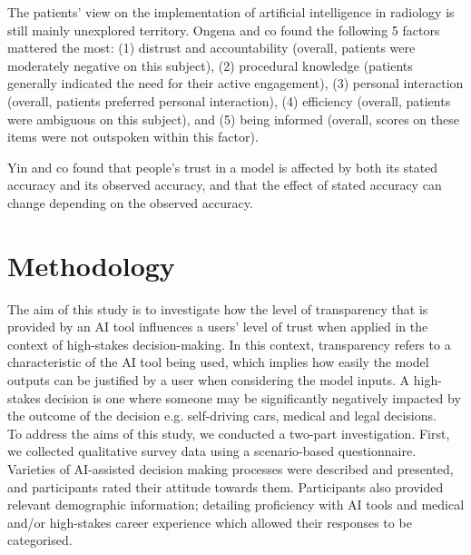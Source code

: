 \documentclass[manuscript,screen,review]{acmart}
\begin{document}
The patients' view on the implementation of artificial intelligence in radiology is still mainly unexplored territory.
Ongena and co found the following 5 factors mattered the most: (1) distrust and accountability (overall, patients were moderately negative on this subject), (2) procedural knowledge (patients generally indicated the need for their active engagement), (3) personal interaction (overall, patients preferred personal interaction), (4) efficiency (overall, patients were ambiguous on this subject), and (5) being informed (overall, scores on these items were not outspoken within this factor)\cite{Ongena2020}.

Yin and co found that people's trust in a model is affected by both its stated accuracy and its observed accuracy, and that the effect of stated accuracy can change depending on the observed accuracy\cite{Yin2019}.



\section{Methodology}\label{sec:methodology}


The aim of this study is to investigate how the level of transparency that is provided by an AI tool influences a users' level of trust when applied in the context of high-stakes decision-making. In this context, transparency refers to a characteristic of the AI tool being used, which implies how easily the model outputs can be justified by a user when considering the model inputs. A high-stakes decision is one where someone may be significantly negatively impacted by the outcome of the decision e.g. self-driving cars, medical and legal decisions.\\

To address the aims of this study, we conducted a two-part investigation. First, we collected qualitative survey data using a scenario-based questionnaire. Varieties of AI-assisted decision making processes were described and presented, and participants rated their attitude towards them. Participants also provided relevant demographic information; detailing proficiency with AI tools and medical and/or high-stakes career experience which allowed their responses to be categorised.\\
\end{document}
